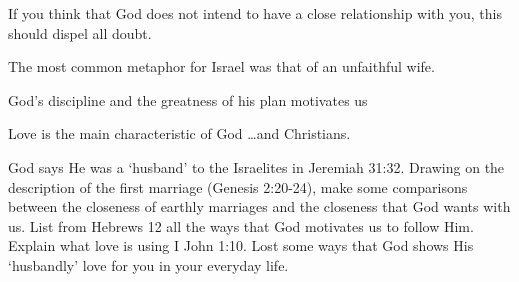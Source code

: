 \begin{discussion}



 If you think that God does not intend to have a close relationship with you, this should dispel all doubt.

The most common metaphor for Israel was that of an unfaithful wife.


 God's discipline and the greatness of his plan motivates us


 Love is the main characteristic of God \ldots and Christians.

\end{discussion}

\begin{questions}
\q God says He was a `husband' to the Israelites in Jeremiah 31:32.  Drawing on the description of the first marriage (Genesis 2:20-24), make some comparisons between the closeness of earthly marriages and the closeness that God wants with us. 
\q List from Hebrews 12 all the ways that God motivates us to follow Him.
\q Explain what love is using I John 1:10.
\q Lost some ways that God shows His `husbandly' love for you in your everyday life.
\end{questions}